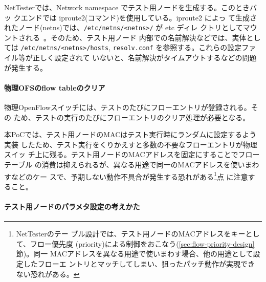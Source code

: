 NetTesterでは、Network namespace でテスト用ノードを生成する。このときバッ
クエンドでは iproute2(コマンド)を使用している。iproute2 によっ
て生成されたノード(netns)では、\verb|/etc/netns/<netns>/| が etc ディレ
クトリとしてマウントされる~\cite{iproute2-doc}。そのため、テスト用ノード
内部での名前解決などでは、実体としては \verb|/etc/netns/<netns>/hosts|,
\verb|resolv.conf| を参照する。これらの設定ファイル等が正しく設定されて
いないと、名前解決がタイムアウトするなどの問題が発生する。

    \paragraph{物理OFSのflow tableのクリア}
物理OpenFlowスイッチには、テストのたびにフローエントリが登録される。その
ため、テストの実行のたびにフローエントリのクリア処理が必要となる。

本PoCでは、テスト用ノードのMACはテスト実行時にランダムに設定するよう実装
したため、テスト実行をくりかえすと多数の不要なフローエントリが物理スイッ
チ上に残る。テスト用ノードのMACアドレスを固定にすることでフローテーブル
の消費は抑えられるが、異なる用途で同一のMACアドレスを使いまわすなどのケー
スで、予期しない動作不具合が発生する恐れがある\footnote{NetTesterのテー
ブル設計では、テスト用ノードのMACアドレスをキーとして、フロー優先度
(priority)による制御をおこなう(\ref{sec:flow-priority-design}節)。同一
MACアドレスを異なる用途で使いまわす場合、他の用途として設定したフローエ
ントリとマッチしてしまい、狙ったパッチ動作が実現できない恐れがある。}点
に注意すること。

    \paragraph{テスト用ノードのパラメタ設定の考えかた}

